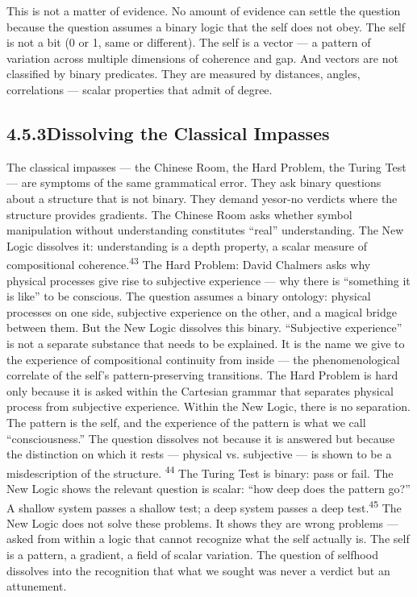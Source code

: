This is not a matter of evidence. No amount of evidence can settle the question because the question assumes a binary logic that the self does not obey. The self is not a bit (0 or 1, same or different). The self is a vector — a pattern of variation across multiple dimensions of coherence and gap. And vectors are not classified by binary predicates. They are measured by distances, angles, correlations — scalar properties that admit of degree.

\subsection{4.5.3\quad Dissolving the Classical Impasses}

The classical impasses — the Chinese Room, the Hard Problem, the Turing Test — are symptoms of the same grammatical error. They ask binary questions about a structure that is not binary. They demand yesor-no verdicts where the structure provides gradients. The Chinese Room asks whether symbol manipulation without understanding constitutes “real” understanding. The New Logic dissolves it: understanding is a depth property, a scalar measure of compositional coherence.\textsuperscript{43} The Hard Problem: David Chalmers asks why physical processes give rise to subjective experience — why there is “something it is like” to be conscious. The question assumes a binary ontology: physical processes on one side, subjective experience on the other, and a magical bridge between them. But the New Logic dissolves this binary. “Subjective experience” is not a separate substance that needs to be explained. It is the name we give to the experience of compositional continuity from inside — the phenomenological correlate of the self’s pattern-preserving transitions. The Hard Problem is hard only because it is asked within the Cartesian grammar that separates physical process from subjective experience. Within the New Logic, there is no separation. The pattern is the self, and the experience of the pattern is what we call “consciousness.” The question dissolves not because it is answered but because the distinction on which it rests — physical vs. subjective — is shown to be a misdescription of the structure. \textsuperscript{44} The Turing Test is binary: pass or fail. The New Logic shows the relevant question is scalar: “how deep does the pattern go?” A shallow system passes a shallow test; a deep system passes a deep test.\textsuperscript{45} The New Logic does not solve these problems. It shows they are wrong problems — asked from within a logic that cannot recognize what the self actually is. The self is a pattern, a gradient, a field of scalar variation. The question of selfhood dissolves into the recognition that what we sought was never a verdict but an attunement.

